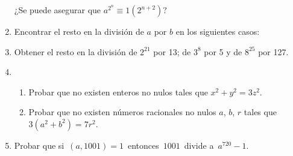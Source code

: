 \documentclass[a4paper,12pt,twoside,spanish,reqno]{amsbook}
\numberwithin{equation}{section}
\begin{document}
\begin{enumerate}
    ¿Se puede asegurar que $a^{2^n} \equiv 1 (2^{n+2})$?


\item Encontrar el resto en la división de $a$ por $b$ en los siguientes casos:


\item Obtener el resto en la división de $2^{21}$ por 13; de $3^8$ por 5 y de  $8^{25}$ por 127.



%


\item 
    \begin{enumerate}
        \item Probar que no existen enteros no nulos tales que $x^2 + y^2 = 3z^2$.
        \item Probar que no existen números racionales no nulos $a$, $b$, $r$ tales que $3(a^2 + b^2) = 7r^2$.
    \end{enumerate}



\item Probar que si \,$(a,1001)=1$\, entonces \,$1001$\, divide a \,$a^{720}-1$.


\end{enumerate}
\end{document}
